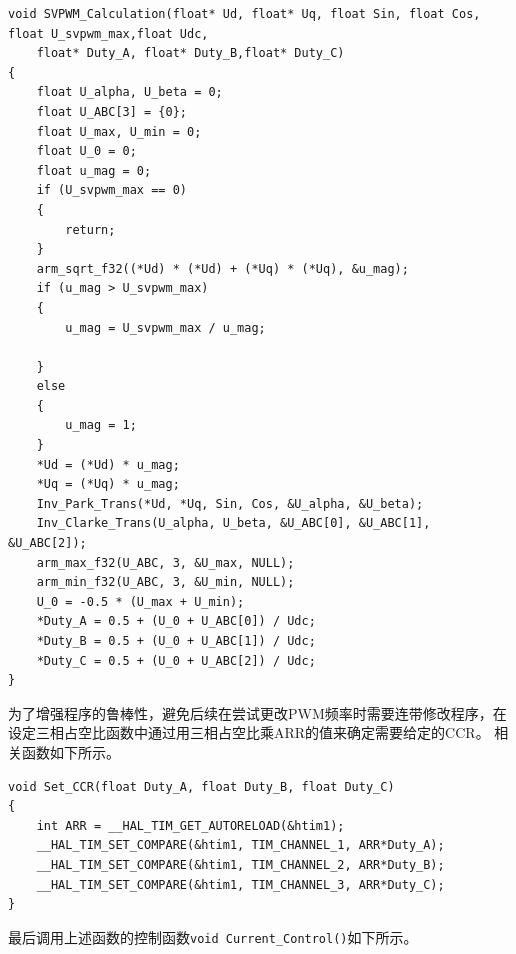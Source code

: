 \begin{lstlisting}
void SVPWM_Calculation(float* Ud, float* Uq, float Sin, float Cos, float U_svpwm_max,float Udc,
    float* Duty_A, float* Duty_B,float* Duty_C)
{
    float U_alpha, U_beta = 0;
    float U_ABC[3] = {0};
    float U_max, U_min = 0;
    float U_0 = 0;
    float u_mag = 0;
    if (U_svpwm_max == 0)
    {
        return;
    }
    arm_sqrt_f32((*Ud) * (*Ud) + (*Uq) * (*Uq), &u_mag);
    if (u_mag > U_svpwm_max)
    {
        u_mag = U_svpwm_max / u_mag;

    }
    else
    {
        u_mag = 1;
    }
    *Ud = (*Ud) * u_mag;
    *Uq = (*Uq) * u_mag;
    Inv_Park_Trans(*Ud, *Uq, Sin, Cos, &U_alpha, &U_beta);
    Inv_Clarke_Trans(U_alpha, U_beta, &U_ABC[0], &U_ABC[1], &U_ABC[2]);
    arm_max_f32(U_ABC, 3, &U_max, NULL);
    arm_min_f32(U_ABC, 3, &U_min, NULL);
    U_0 = -0.5 * (U_max + U_min);
    *Duty_A = 0.5 + (U_0 + U_ABC[0]) / Udc;
    *Duty_B = 0.5 + (U_0 + U_ABC[1]) / Udc;
    *Duty_C = 0.5 + (U_0 + U_ABC[2]) / Udc;
}  
\end{lstlisting}

为了增强程序的鲁棒性，避免后续在尝试更改PWM频率时需要连带修改程序，在设定三相占空比函数中通过用三相占空比乘ARR的值来确定需要给定的CCR。
相关函数如下所示。

\begin{lstlisting}
void Set_CCR(float Duty_A, float Duty_B, float Duty_C)
{
    int ARR = __HAL_TIM_GET_AUTORELOAD(&htim1);
    __HAL_TIM_SET_COMPARE(&htim1, TIM_CHANNEL_1, ARR*Duty_A);
    __HAL_TIM_SET_COMPARE(&htim1, TIM_CHANNEL_2, ARR*Duty_B);
    __HAL_TIM_SET_COMPARE(&htim1, TIM_CHANNEL_3, ARR*Duty_C);
}  
\end{lstlisting}

最后调用上述函数的控制函数\texttt{void Current\_Control()}如下所示。

